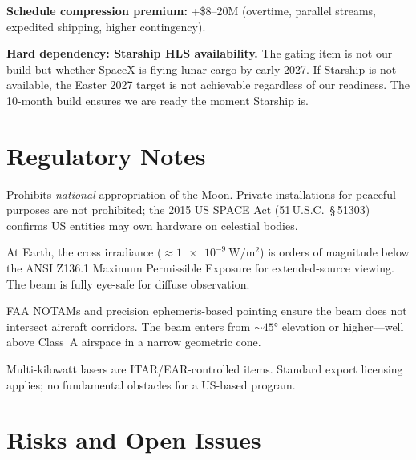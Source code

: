 \documentclass[12pt,letterpaper]{article}
\begin{document}
\noindent \textbf{Schedule compression premium:} +\$8--20M (overtime, parallel
streams, expedited shipping, higher contingency).

\medskip
\noindent \textbf{Hard dependency: Starship HLS availability.} The gating item
is not our build but whether SpaceX is flying lunar cargo by early 2027.
If Starship is not available, the Easter 2027 target is not achievable
regardless of our readiness. The 10-month build ensures we are ready the
moment Starship is.

\section{Regulatory Notes}

\begin{description}[leftmargin=1.5em, style=nextline]
  \item[Outer Space Treaty (1967), Article II]
    Prohibits \emph{national} appropriation of the Moon. Private installations
    for peaceful purposes are not prohibited; the 2015 US SPACE Act (51\,U.S.C.\
    \S\,51303) confirms US entities may own hardware on celestial bodies.
  \item[Laser safety]
    At Earth, the cross irradiance ($\approx\SI{1e-9}{\watt\per\meter\squared}$)
    is orders of magnitude below the ANSI Z136.1 Maximum Permissible Exposure for
    extended-source viewing. The beam is fully eye-safe for diffuse observation.
  \item[Aviation]
    FAA NOTAMs and precision ephemeris-based pointing ensure the beam does not
    intersect aircraft corridors. The beam enters from $\sim\ang{45}$ elevation
    or higher---well above Class~A airspace in a narrow geometric cone.
  \item[Export control]
    Multi-kilowatt lasers are ITAR/EAR-controlled items. Standard export
    licensing applies; no fundamental obstacles for a US-based program.
\end{description}

\section{Risks and Open Issues}
\end{document}
